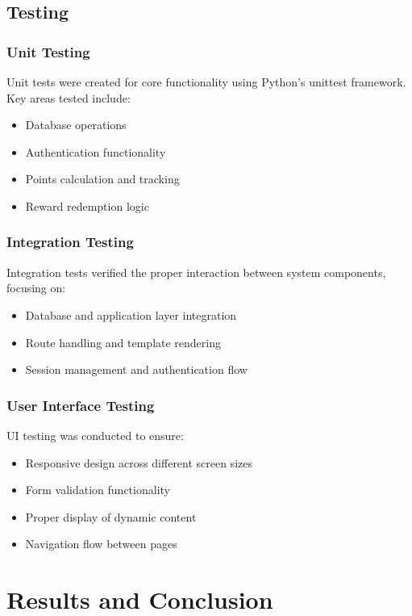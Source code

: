 \documentclass[12pt,a4paper]{report}
\begin{document}
\section{Testing}

\subsection{Unit Testing}
Unit tests were created for core functionality using Python's unittest framework. Key areas tested include:

\begin{itemize}
    \item Database operations
    \item Authentication functionality
    \item Points calculation and tracking
    \item Reward redemption logic
\end{itemize}

\subsection{Integration Testing}
Integration tests verified the proper interaction between system components, focusing on:

\begin{itemize}
    \item Database and application layer integration
    \item Route handling and template rendering
    \item Session management and authentication flow
\end{itemize}

\subsection{User Interface Testing}
UI testing was conducted to ensure:

\begin{itemize}
    \item Responsive design across different screen sizes
    \item Form validation functionality
    \item Proper display of dynamic content
    \item Navigation flow between pages
\end{itemize}

\chapter{Results and Conclusion}
\end{document}
